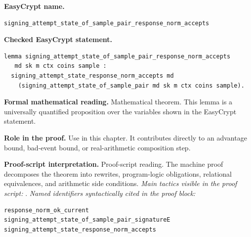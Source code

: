 \begin{formaltheorem}
\noindent\textbf{EasyCrypt name.}
\begin{lstlisting}[language=EasyCrypt,basicstyle=\ttfamily\scriptsize]
signing_attempt_state_of_sample_pair_response_norm_accepts
\end{lstlisting}
\noindent\textbf{Checked EasyCrypt statement.}
\begin{lstlisting}[language=EasyCrypt,basicstyle=\ttfamily\scriptsize]
lemma signing_attempt_state_of_sample_pair_response_norm_accepts
   md sk m ctx coins sample :
  signing_attempt_state_response_norm_accepts md
    (signing_attempt_state_of_sample_pair md sk m ctx coins sample).
\end{lstlisting}
\noindent\textbf{Formal mathematical reading.}
Mathematical theorem. This lemma is a universally quantified proposition over the variables shown in the EasyCrypt statement.

\noindent\textbf{Role in the proof.}
Use in this chapter. It contributes directly to an advantage bound, bad-event bound, or real-arithmetic composition step.

\noindent\textbf{Proof-script interpretation.}
Proof-script reading. The machine proof decomposes the theorem into rewrites, program-logic obligations, relational equivalences, and arithmetic side conditions.
\emph{Main tactics visible in the proof script:} .
\emph{Named identifiers syntactically cited in the proof block:}
\begin{lstlisting}[language=EasyCrypt,basicstyle=\ttfamily\scriptsize]
response_norm_ok_current
signing_attempt_state_of_sample_pair_signatureE
signing_attempt_state_response_norm_accepts
\end{lstlisting}

\end{formaltheorem}

